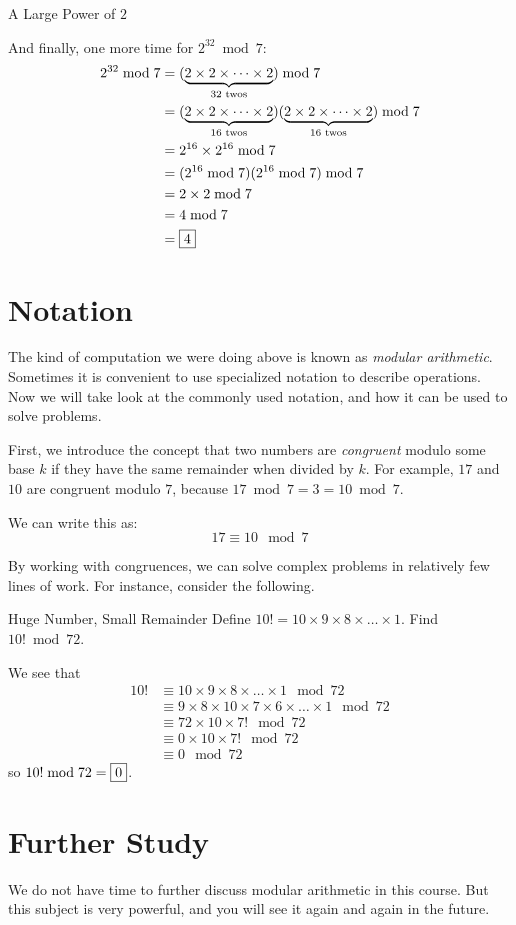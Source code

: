 \documentclass[a4paper,10pt]{report}
\begin{document}
\begin{problem}{A Large Power of $2$}
\begin{solution}
  And finally, one more time for $2^{32} \bmod 7$: \begin{align*}
   2^{32} \bmod 7
   &= (\underbrace{2 \times 2 \times \dots \times 2}_{32\text{ twos}}) \bmod 7 \\
   &= (\underbrace{2 \times 2 \times \dots \times 2}_{16\text{ twos}})
   (\underbrace{2 \times 2 \times \dots \times 2}_{16\text{ twos}}) \bmod 7 \\
   &= 2^{16}\times2^{16} \bmod 7 \\
   &= (2^{16} \bmod 7)(2^{16} \bmod 7) \bmod 7 \\
   &= 2 \times 2 \bmod 7 \\
   &= 4 \bmod 7 \\
   &= \Ans{4}
  \end{align*}

 \end{solution}
\end{problem}

\section{Notation}

The kind of computation we were doing above is known as \emph{modular
arithmetic}. Sometimes it is convenient to use specialized notation to describe
operations. Now we will take look at the commonly used notation, and how it can
be used to solve problems.

First, we introduce the concept that two numbers are \emph{congruent} modulo
some base $k$ if they have the same remainder when divided by $k$. For example,
$17$ and $10$ are congruent modulo $7$, because $17 \bmod 7 = 3 = 10 \bmod 7$.

We can write this as: \[
 17 \equiv 10 \mod 7
\]

By working with congruences, we can solve complex problems in relatively few
lines of work. For instance, consider the following.

\begin{problem}{Huge Number, Small Remainder}
 Define $10! = 10 \times 9 \times 8 \times \dots \times 1$. Find $10! \bmod 72$.

 \begin{solution}
  We see that \begin{align*}
   10!
   &\equiv 10 \times 9 \times 8 \times \dots \times 1 \mod 72 \\
   &\equiv 9 \times 8 \times 10 \times 7 \times 6 \times \dots \times 1
   \mod 72 \\
   &\equiv 72 \times 10 \times 7! \mod 72 \\
   &\equiv 0 \times 10 \times 7! \mod 72 \\
   &\equiv 0 \mod 72
  \end{align*}
  so $10! \bmod 72 = \Ans{0}$.
 \end{solution}
\end{problem}

\section{Further Study}

We do not have time to further discuss modular arithmetic in this course. But
this subject is very powerful, and you will see it again and again in the
future.
\end{document}
